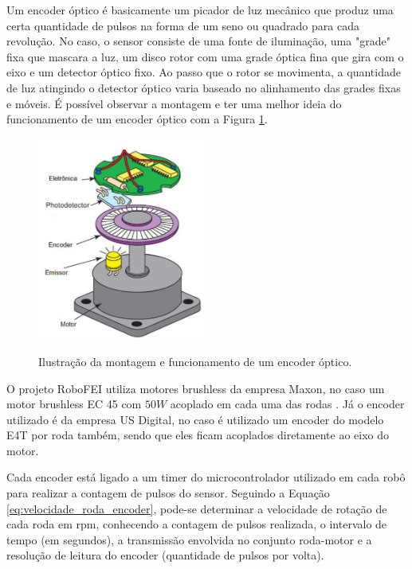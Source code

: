 \documentclass[acronym, symbols, table, deposito]{fei}
\begin{document}
				Um encoder óptico é basicamente um picador de luz mecânico que produz uma certa quantidade de pulsos na forma de um seno ou quadrado para cada revolução. No caso, o sensor consiste de uma fonte de iluminação, uma "grade" fixa que mascara a luz, um disco rotor com uma grade óptica fina que gira com o eixo e um detector óptico fixo. Ao passo que o rotor se movimenta, a quantidade de luz atingindo o detector óptico varia baseado no alinhamento das grades fixas e móveis. É possível observar a montagem e ter uma melhor ideia do funcionamento de um encoder óptico com a Figura \ref{fig:optical_encoder}.
				
				\begin{figure}[!htb]
					\centering
					\caption{Ilustração da montagem e funcionamento de um encoder óptico.} 
					\includegraphics[width=0.5\textwidth]{encoder_optico.png}
					\label{fig:optical_encoder}
				\end{figure}
				
				O projeto RoboFEI utiliza motores brushless da empresa Maxon\textregistered, no caso um motor brushless EC 45 com $50W$ acoplado em cada uma das rodas \cite{ec45_maxon}. Já o encoder utilizado é da empresa US Digital\textregistered \cite{e4t_encoder}, no caso é utilizado um encoder do modelo E4T por roda também, sendo que eles ficam acoplados diretamente ao eixo do motor.
				
				Cada encoder está ligado a um timer do microcontrolador utilizado em cada robô para realizar a contagem de pulsos do sensor. Seguindo a Equação \eqref{eq:velocidade_roda_encoder}, pode-se determinar a velocidade de rotação de cada roda em rpm, conhecendo a contagem de pulsos realizada, o intervalo de tempo (em segundos), a transmissão envolvida no conjunto roda-motor e a resolução de leitura do encoder (quantidade de pulsos por volta).
				
\end{document}
